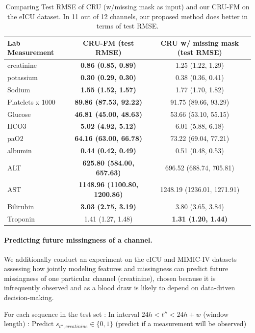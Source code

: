 \begin{table}[ht]
\centering
\label{tab:cru_fm_vs_cru_w_mask}
\begin{tabular}{lcc}
\toprule
Lab Measurement & CRU-FM (test RMSE) & CRU w/ missing mask (test RMSE) \\ 
\midrule
creatinine & \textbf{0.86 (0.85, 0.89) }& 1.25 (1.22, 1.29) \\
potassium & \textbf{0.30 (0.29, 0.30)} & 0.38 (0.36, 0.41) \\
Sodium & \textbf{1.55 (1.52, 1.57)} & 1.77 (1.70, 1.82) \\
Platelets x 1000 & \textbf{89.86 (87.53, 92.22)} & 91.75 (89.66, 93.29) \\
Glucose & \textbf{46.81 (45.00, 48.63)} & 53.66 (53.10, 55.15) \\
HCO3 & \textbf{5.02 (4.92, 5.12)} & 6.01 (5.88, 6.18) \\
paO2 & \textbf{64.16 (63.00, 66.78)} & 73.22 (69.04, 77.21) \\
albumin & \textbf{0.44 (0.42, 0.49)} & 0.51 (0.48, 0.53) \\
ALT & \textbf{625.80 (584.00, 657.63)} & 696.52 (688.74, 705.81) \\
AST & \textbf{1148.96 (1100.80, 1200.86)} & 1248.19 (1236.01, 1271.91) \\
Bilirubin & \textbf{3.03 (2.75, 3.19)} & 3.80 (3.65, 3.84) \\
Troponin & 1.41 (1.27, 1.48) & \textbf{1.31 (1.20, 1.44) }\\
\bottomrule
\end{tabular}
\caption[Test RMSE of CRU (w/missing mask as input) and our CRU-FM on eICU dataset]{Comparing Test RMSE of CRU (w/missing mask as input) and our CRU-FM on the eICU dataset. In 11 out of 12 channels, our proposed method does better in terms of test RMSE.}
\end{table}


\paragraph{Predicting future missingness of a channel.} 
We additionally conduct  an experiment on the eICU and MIMIC-IV datasets assessing how jointly modeling features and missingness can predict future missingness of one particular channel (creatinine), chosen because it is infrequently observed and as a blood draw is likely to depend on data-driven decision-making. 
 
For each sequence in the test set :
	In interval $24h<t''<24h+w$ (window length) :
		Predict $s_{t'', creatinine} \in \{0, 1\}$ (predict if a measurement will be observed)

